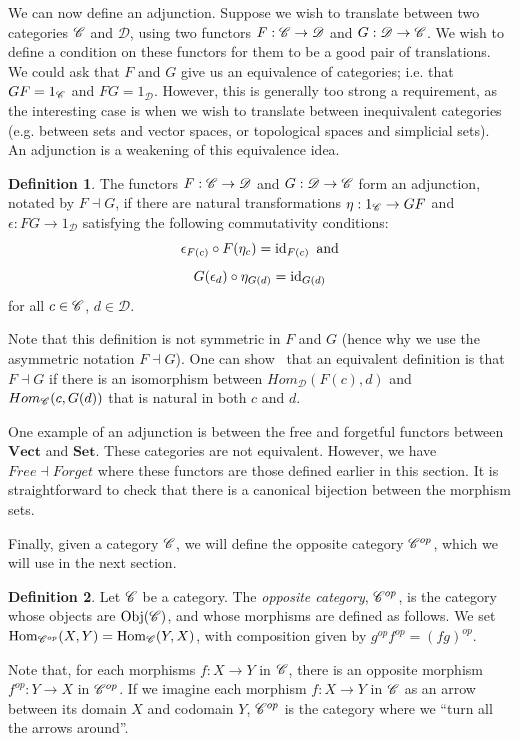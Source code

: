 \documentclass[a4paper,11pt,leqno]{article} \usepackage{amsmath}
\newcommand{\curD}{\mathscr{D}} \newcommand{\curI}{\mathscr{I}}
\newcommand{\id}{\ensuremath{\operatorname{id}}}
\newcommand{\Hom}{\ensuremath{\operatorname{Hom}}}
\newcommand{\Obj}{\ensuremath{\operatorname{Obj}}}
\theoremstyle{definition}
\newtheorem{defn}{Definition}
\begin{document}
We can now define an adjunction.
Suppose we wish to translate between two categories $\mathscr{C}$ and $\curD$, using
two functors $F: \curC\to \curD$ and $G: \curD\to\curC$.
We wish to define a condition on these functors for them to be a good pair of
translations.
We could ask that $F$ and $G$ give us an equivalence of categories; i.e. that
$GF = 1_{\mathscr{C}}$ and $FG = 1_{\curD}$.
However, this is generally too strong a requirement, as the interesting case is
when we wish to translate between inequivalent categories (e.g. between sets
and vector spaces, or topological spaces and simplicial sets).
An adjunction is a weakening of this equivalence idea. 

\begin{defn}
  The functors $F: \curC\to\curD$ and $G: \curD\to\curC$ form an adjunction,
  notated by $F\dashv G$, if there are natural transformations $\eta:
  1_{\mathscr{C}}\to GF$ and $\epsilon: FG\to 1_\curD$ satisfying the following 
  commutativity conditions:
  $$\epsilon_{F(c)}\of F(\eta_c) = \id_{F(c)}\text{ and} $$
  $$G(\epsilon_d)\of \eta_{G(d)} = \id_{G(d)}$$
  for all $c\in\mathscr{C}$, $d\in\curD$.
\end{defn}

Note that this definition is not symmetric in $F$ and $G$ (hence why we use the
asymmetric notation $F\dashv G$).
One can show~\cite[Section 4]{Riehl} that an equivalent definition is that
$F\dashv G$ if there is an isomorphism between $Hom_\curD(F(c), d)$ and
$Hom_{\mathscr{C}}(c, G(d))$ that is natural in both $c$ and $d$.

One example of an adjunction is between the free and forgetful functors between
$\textbf{Vect}$ and $\textbf{Set}$.
These categories are not equivalent.
However, we have $Free\dashv Forget$ where these functors are those defined
earlier in this section.
It is straightforward to check that there is a canonical bijection between the
morphism sets.

Finally, given a category $\mathscr{C}$, we will define the opposite category $\mathscr{C}^{op}$,
which we will use in the next section.
\begin{defn}
  Let $\mathscr{C}$ be a category.
  The \emph{opposite category}, $\mathscr{C}^{op}$, is the category whose objects are
  $\Obj(\curC)$, and whose morphisms are defined as follows.
  We set $\Hom_{\curC^{op}}(X, Y) = \Hom_{\curC}(Y, X)$, with composition given
  by $g^{op}f^{op} = (fg)^{op}$.
\end{defn}
Note that, for each morphisms $f: X\to Y$ in $\mathscr{C}$, there is an opposite
morphism $f^{op}: Y\to X$ in $\mathscr{C}^{op}$.
If we imagine each morphism $f: X\to Y$ in $\mathscr{C}$ as an arrow between its
domain $X$ and codomain $Y$, $\mathscr{C}^{op}$ is the category where we ``turn all
the arrows around''.
\end{document}
